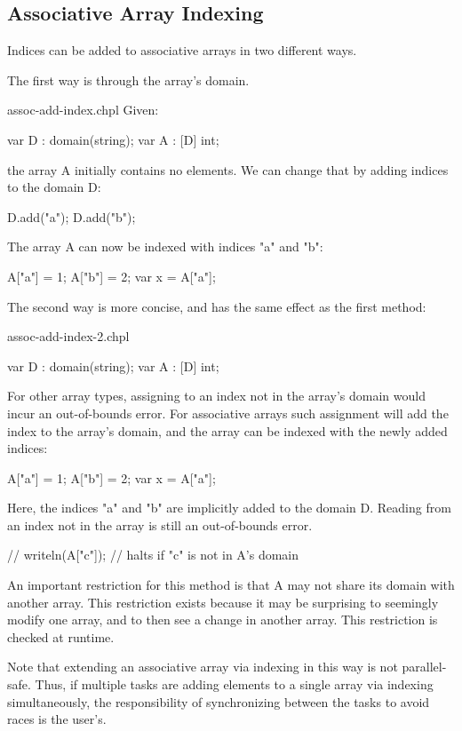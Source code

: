\subsection{Associative Array Indexing}
\label{Associative_Array_Indexing}

Indices can be added to associative arrays in two different ways.

The first way is through the array's domain.
\begin{chapelexample}{assoc-add-index.chpl}
Given:
\begin{chapel}
var D : domain(string);
var A : [D] int;
\end{chapel}

the array A initially contains no elements. We can change that by adding
indices to the domain D:
\begin{chapel}
D.add("a");
D.add("b");
\end{chapel}

The array A can now be indexed with indices "a" and "b":

\begin{chapel}
A["a"] = 1;
A["b"] = 2;
var x = A["a"];
\end{chapel}
\end{chapelexample}

The second way is more concise, and has the same effect as the first method:
\begin{chapelexample}{assoc-add-index-2.chpl}
\begin{chapel}
var D : domain(string);
var A : [D] int;
\end{chapel}
For other array types, assigning to an index not in the array's domain
would incur an out-of-bounds error. For associative arrays such assignment will
add the index to the array's domain, and the array can be indexed with the
newly added indices:
\begin{chapel}
A["a"] = 1;
A["b"] = 2;
var x = A["a"];
\end{chapel}
Here, the indices "a" and "b" are implicitly added to the domain D. Reading from
an index not in the array is still an out-of-bounds error.

\begin{chapel}
// writeln(A["c"]); // halts if "c" is not in A's domain
\end{chapel}
An important restriction for this method is that A may not share its domain
with another array. This restriction exists because it may be surprising to
seemingly modify one array, and to then see a change in another array. This
restriction is checked at runtime.

Note that extending an associative array via indexing in this way is
not parallel-safe.  Thus, if multiple tasks are adding elements to a
single array via indexing simultaneously, the responsibility of
synchronizing between the tasks to avoid races is the user's.
\end{chapelexample}


